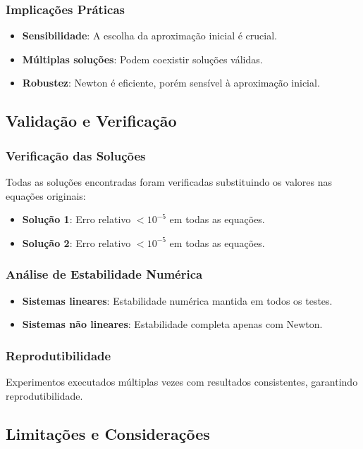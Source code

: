 \documentclass[12pt,a4paper]{article}
\begin{document}
\subsubsection{Implicações Práticas}
\begin{itemize}
    \item \textbf{Sensibilidade}: A escolha da aproximação inicial é crucial.
    \item \textbf{Múltiplas soluções}: Podem coexistir soluções válidas.
    \item \textbf{Robustez}: Newton é eficiente, porém sensível à aproximação inicial.
\end{itemize}

\subsection{Validação e Verificação}

\subsubsection{Verificação das Soluções}
Todas as soluções encontradas foram verificadas substituindo os valores nas equações originais:
\begin{itemize}
    \item \textbf{Solução 1}: Erro relativo $<10^{-5}$ em todas as equações.
    \item \textbf{Solução 2}: Erro relativo $<10^{-5}$ em todas as equações.
\end{itemize}

\subsubsection{Análise de Estabilidade Numérica}
\begin{itemize}
    \item \textbf{Sistemas lineares}: Estabilidade numérica mantida em todos os testes.
    \item \textbf{Sistemas não lineares}: Estabilidade completa apenas com Newton.
\end{itemize}

\subsubsection{Reprodutibilidade}
Experimentos executados múltiplas vezes com resultados consistentes, garantindo reprodutibilidade.

\subsection{Limitações e Considerações}
\end{document}

